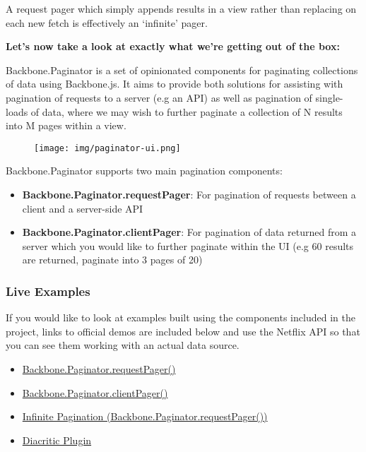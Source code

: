 \documentclass[9pt]{book}
\begin{document}
A request pager which simply appends results in a view rather than
replacing on each new fetch is effectively an `infinite' pager.

\textbf{Let's now take a look at exactly what we're getting out of the
box:}

Backbone.Paginator is a set of opinionated components for paginating
collections of data using Backbone.js. It aims to provide both solutions
for assisting with pagination of requests to a server (e.g an API) as
well as pagination of single-loads of data, where we may wish to further
paginate a collection of N results into M pages within a view.

\begin{figure}[htbp]
\centering
\texttt{[image: img/paginator-ui.png]}
\end{figure}

Backbone.Paginator supports two main pagination components:

\begin{itemize}
\itemsep1pt\parskip0pt
\item
  \textbf{Backbone.Paginator.requestPager}: For pagination of requests
  between a client and a server-side API
\item
  \textbf{Backbone.Paginator.clientPager}: For pagination of data
  returned from a server which you would like to further paginate within
  the UI (e.g 60 results are returned, paginate into 3 pages of 20)
\end{itemize}

\subsubsection{Live Examples}\label{live-examples}

If you would like to look at examples built using the components
included in the project, links to official demos are included below and
use the Netflix API so that you can see them working with an actual data
source.

\begin{itemize}
\itemsep1pt\parskip0pt
\item
  \href{http://addyosmani.github.com/backbone.paginator/examples/netflix-request-paging/index.html}{Backbone.Paginator.requestPager()}
\item
  \href{http://addyosmani.github.com/backbone.paginator/examples/netflix-client-paging/index.html}{Backbone.Paginator.clientPager()}
\item
  \href{http://addyosmani.github.com/backbone.paginator/examples/netflix-infinite-paging/index.html}{Infinite
  Pagination (Backbone.Paginator.requestPager())}
\item
  \href{http://addyosmani.github.com/backbone.paginator/examples/google-diacritic/index.html}{Diacritic
  Plugin}
\end{itemize}
\end{document}
